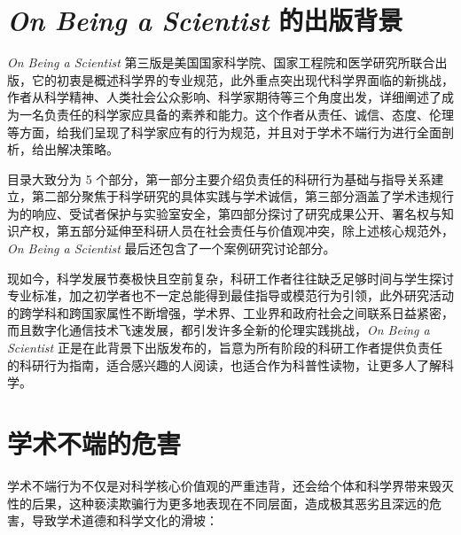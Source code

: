 \documentclass[12pt, hyperref, a4paper, UTF8]{ctexart}
\begin{document}
\cover
\thispagestyle{empty}
\clearpage
\setcounter{page}{1}



\section{\textit{On Being a Scientist} 的出版背景}
\textit{On Being a Scientist} 第三版是美国国家科学院、国家工程院和医学研究所联合出版，它的初衷是概述科学界的专业规范，此外重点突出现代科学界面临的新挑战，作者从科学精神、人类社会公众影响、科学家期待等三个角度出发，详细阐述了成为一名负责任的科学家应具备的素养和能力。这个作者从责任、诚信、态度、伦理等方面，给我们呈现了科学家应有的行为规范，并且对于学术不端行为进行全面剖析，给出解决策略。

目录大致分为 5 个部分，第一部分主要介绍负责任的科研行为基础与指导关系建立，第二部分聚焦于科学研究的具体实践与学术诚信，第三部分涵盖了学术违规行为的响应、受试者保护与实验室安全，第四部分探讨了研究成果公开、署名权与知识产权，第五部分延伸至科研人员在社会责任与价值观冲突，除上述核心规范外，\textit{On Being a Scientist} 最后还包含了一个案例研究讨论部分。

现如今，科学发展节奏极快且空前复杂，科研工作者往往缺乏足够时间与学生探讨专业标准，加之初学者也不一定总能得到最佳指导或模范行为引领，此外研究活动的跨学科和跨国家属性不断增强，学术界、工业界和政府社会之间联系日益紧密，而且数字化通信技术飞速发展，都引发许多全新的伦理实践挑战，\textit{On Being a Scientist} 正是在此背景下出版发布的，旨意为所有阶段的科研工作者提供负责任的科研行为指南，适合感兴趣的人阅读，也适合作为科普性读物，让更多人了解科学。



\section{学术不端的危害}
学术不端行为不仅是对科学核心价值观的严重违背，还会给个体和科学界带来毁灭性的后果，这种亵渎欺骗行为更多地表现在不同层面，造成极其恶劣且深远的危害，导致学术道德和科学文化的滑坡：
\end{document}
